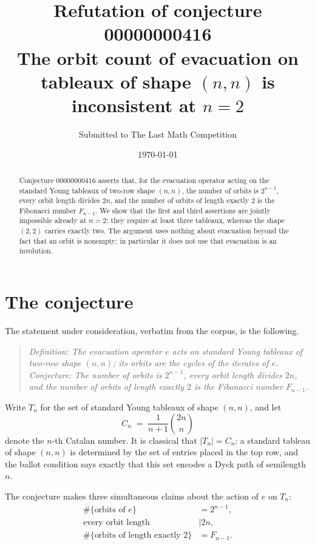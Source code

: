 \documentclass[11pt]{article}
\title{Refutation of conjecture 00000000416\\[2mm]
\large The orbit count of evacuation on tableaux of shape $(n,n)$ is inconsistent at $n=2$}
\author{Submitted to The Last Math Competition}
\date{\today}
\theoremstyle{remark}
\begin{document}
\maketitle

\begin{abstract}
\noindent
Conjecture 00000000416 asserts that, for the evacuation operator acting on the
standard Young tableaux of two-row shape $(n,n)$, the number of orbits is
$2^{n-1}$, every orbit length divides $2n$, and the number of orbits of length
exactly $2$ is the Fibonacci number $F_{n-1}$. We show that the first and third
assertions are jointly impossible already at $n=2$: they require at least three
tableaux, whereas the shape $(2,2)$ carries exactly two. The argument uses
nothing about evacuation beyond the fact that an orbit is nonempty; in
particular it does not use that evacuation is an involution.
\end{abstract}

\section{The conjecture}

The statement under consideration, verbatim from the corpus, is the following.

\begin{quote}
\emph{Definition: The evacuation operator $e$ acts on standard Young tableaux of
two-row shape $(n,n)$; its orbits are the cycles of the iterates of $e$.
Conjecture: The number of orbits is $2^{n-1}$, every orbit length divides $2n$,
and the number of orbits of length exactly $2$ is the Fibonacci number
$F_{n-1}$.}
\end{quote}

Write $T_n$ for the set of standard Young tableaux of shape $(n,n)$, and let
\[
  C_n \;=\; \frac{1}{n+1}\binom{2n}{n}
\]
denote the $n$-th Catalan number. It is classical that $|T_n| = C_n$: a standard
tableau of shape $(n,n)$ is determined by the set of entries placed in the top
row, and the ballot condition says exactly that this set encodes a Dyck path of
semilength~$n$.

The conjecture makes three simultaneous claims about the action of $e$ on
$T_n$:
\begin{align}
  \#\{\text{orbits of } e\} &= 2^{n-1}, \label{eq:orbits}\\
  \text{every orbit length} &\mid 2n, \label{eq:divides}\\
  \#\{\text{orbits of length exactly } 2\} &= F_{n-1}. \label{eq:lengthtwo}
\end{align}
\end{document}
